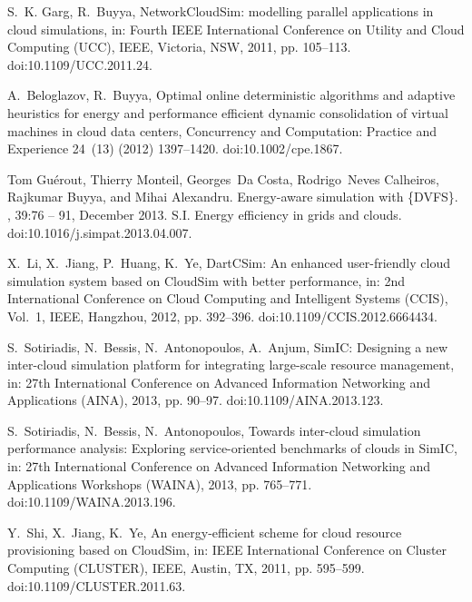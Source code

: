 \documentclass[sort, compress, 5p]{elsarticle}
\begin{document}
\begin{thebibliography}{10}
S.~K. Garg, R.~Buyya, {NetworkCloudSim}: modelling parallel applications in
  cloud simulations, in: Fourth IEEE International Conference on Utility and
  Cloud Computing (UCC), IEEE, Victoria, NSW, 2011, pp. 105--113.
\newblock doi:10.1109/UCC.2011.24.

A.~Beloglazov, R.~Buyya, Optimal online deterministic algorithms and adaptive
  heuristics for energy and performance efficient dynamic consolidation of
  virtual machines in cloud data centers, Concurrency and Computation: Practice
  and Experience 24~(13) (2012) 1397--1420.
\newblock doi:10.1002/cpe.1867.

Tom Gu\'erout, Thierry Monteil, Georges~Da Costa, Rodrigo~Neves Calheiros,
Rajkumar Buyya, and Mihai Alexandru.
\newblock Energy-aware simulation with \{DVFS\}.
, 39:76 -- 91, December
2013.
\newblock S.I. Energy efficiency in grids and clouds.
\newblock doi:10.1016/j.simpat.2013.04.007.

X.~Li, X.~Jiang, P.~Huang, K.~Ye, {DartCSim}: An enhanced user-friendly cloud
  simulation system based on {CloudSim} with better performance, in: 2nd
  International Conference on Cloud Computing and Intelligent Systems (CCIS),
  Vol.~1, IEEE, Hangzhou, 2012, pp. 392--396.
\newblock doi:10.1109/CCIS.2012.6664434.

S.~Sotiriadis, N.~Bessis, N.~Antonopoulos, A.~Anjum, {SimIC}: Designing a new
  inter-cloud simulation platform for integrating large-scale resource
  management, in: 27th International Conference on Advanced Information
  Networking and Applications (AINA), 2013, pp. 90--97.
\newblock doi:10.1109/AINA.2013.123.

S.~Sotiriadis, N.~Bessis, N.~Antonopoulos, Towards inter-cloud simulation
  performance analysis: Exploring service-oriented benchmarks of clouds in
  {SimIC}, in: 27th International Conference on Advanced Information Networking
  and Applications Workshops (WAINA), 2013, pp. 765--771.
\newblock doi:10.1109/WAINA.2013.196.

Y.~Shi, X.~Jiang, K.~Ye, An energy-efficient scheme for cloud resource
  provisioning based on {CloudSim}, in: IEEE International Conference on
  Cluster Computing (CLUSTER), IEEE, Austin, TX, 2011, pp. 595--599.
\newblock doi:10.1109/CLUSTER.2011.63.


\end{thebibliography}
\end{document}
